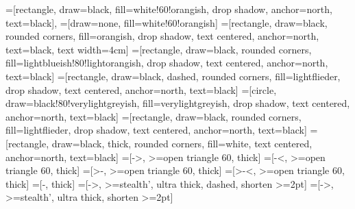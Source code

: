 =[rectangle,%
                    draw=black,%
                     fill=white!60!orangish,%
                     drop shadow,%
                     anchor=north,%
                     text=black],
=[draw=none,%
                      fill=white!60!orangish]%
=[rectangle,%
                    draw=black,%
                    rounded corners,%
                    fill=orangish,%
                    drop shadow,%
                    text centered,%
                    anchor=north,%
                    text=black,%
                    text width=4cm]
=[rectangle,%
                    draw=black,%
                    rounded corners,%
                    fill=lightblueish!80!lightorangish,
                    drop shadow,%
                    text centered,%
                    anchor=north,%
                    text=black]%
=[rectangle,%
                    draw=black,%
                    dashed,%
                    rounded corners,%
                    fill=lightflieder,
                    drop shadow,%
                    text centered,%
                    anchor=north,%
                    text=black]%
=[circle,%
                    draw=black!80!verylightgreyish,%
                    fill=verylightgreyish,%
                    drop shadow,%
                    text centered,%
                    anchor=north,%
                    text=black]
=[rectangle,%
                     draw=black,%
                     rounded corners,%
                     fill=lightflieder,%
                     drop shadow,%
                     text centered,%
                     anchor=north,%
                     text=black]
=[rectangle,%
                     draw=black,%
                     thick,
                     rounded corners,%
                     fill=white,%
                     text centered,%
                     anchor=north,
                     text=black]
=[->, >=open triangle 60, thick]
=[-<, >=open triangle 60, thick]
=[>-, >=open triangle 60, thick]
=[>-<, >=open triangle 60, thick]
=[-, thick]
=[->, >=stealth', ultra thick, dashed, shorten >=2pt]
=[->, >=stealth', ultra thick, shorten >=2pt]



